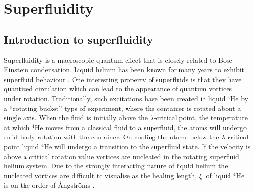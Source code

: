 \section{Superfluidity}\label{sec:superfluid}
\subsection{Introduction to superfluidity}

Superfluidity is a macroscopic quantum effect that is closely related to Bose--Einstein condensation. Liquid helium has been known for many years to exhibit superfluid behaviour \cite{BEC:Penrose_pr_1956}. One interesting property of superfluids is that they have quantized circulation which can lead to the appearance of quantum vortices under rotation. Traditionally, such excitations have been created in liquid $^4$He by a ``rotating bucket'' type of experiment, where the container is rotated about a single axis. When the fluid is initially above the $\lambda$-critical point, the temperature at which $^4$He moves from a classical fluid to a superfluid, the atoms will undergo solid-body rotation with the container. On cooling the atoms below the $\lambda$-critical point liquid $^4$He will undergo a transition to the superfluid state. If the velocity is above a critical rotation value vortices are nucleated in the rotating superfluid helium system. Due to the strongly interacting nature of liquid helium the nucleated vortices are difficult to visualise as the healing length, $\xi$, of liquid $^4$He is on the order of {\r{A}}ngstr{\"o}ms \cite{BEC:Srinivasen_pramana_2006}.


